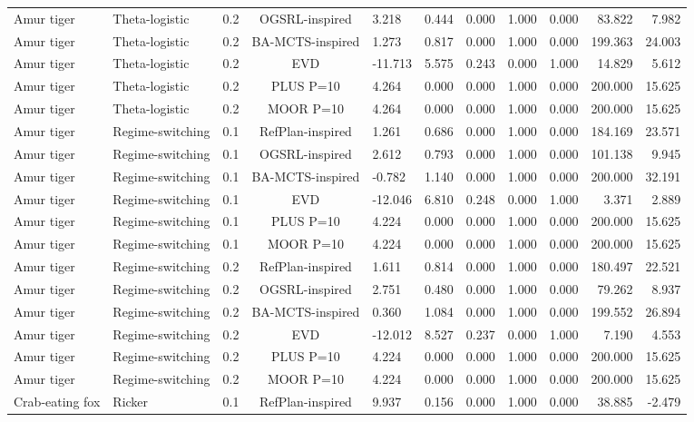 \documentclass[10pt]{article}
\begin{document}
\begin{landscape}
\begin{center}
\begin{longtable}{@{}lllclrrrrrr@{}}
Amur tiger & Theta-logistic & 0.2 & OGSRL-inspired & 3.218 & 0.444 & 0.000 & 1.000 & 0.000 & 83.822 & 7.982 \\
Amur tiger & Theta-logistic & 0.2 & BA-MCTS-inspired & 1.273 & 0.817 & 0.000 & 1.000 & 0.000 & 199.363 & 24.003 \\
Amur tiger & Theta-logistic & 0.2 & EVD & -11.713 & 5.575 & 0.243 & 0.000 & 1.000 & 14.829 & 5.612 \\
Amur tiger & Theta-logistic & 0.2 & PLUS P=10 & 4.264 & 0.000 & 0.000 & 1.000 & 0.000 & 200.000 & 15.625 \\
Amur tiger & Theta-logistic & 0.2 & MOOR P=10 & 4.264 & 0.000 & 0.000 & 1.000 & 0.000 & 200.000 & 15.625 \\
Amur tiger & Regime-switching & 0.1 & RefPlan-inspired & 1.261 & 0.686 & 0.000 & 1.000 & 0.000 & 184.169 & 23.571 \\
Amur tiger & Regime-switching & 0.1 & OGSRL-inspired & 2.612 & 0.793 & 0.000 & 1.000 & 0.000 & 101.138 & 9.945 \\
Amur tiger & Regime-switching & 0.1 & BA-MCTS-inspired & -0.782 & 1.140 & 0.000 & 1.000 & 0.000 & 200.000 & 32.191 \\
Amur tiger & Regime-switching & 0.1 & EVD & -12.046 & 6.810 & 0.248 & 0.000 & 1.000 & 3.371 & 2.889 \\
Amur tiger & Regime-switching & 0.1 & PLUS P=10 & 4.224 & 0.000 & 0.000 & 1.000 & 0.000 & 200.000 & 15.625 \\
Amur tiger & Regime-switching & 0.1 & MOOR P=10 & 4.224 & 0.000 & 0.000 & 1.000 & 0.000 & 200.000 & 15.625 \\
Amur tiger & Regime-switching & 0.2 & RefPlan-inspired & 1.611 & 0.814 & 0.000 & 1.000 & 0.000 & 180.497 & 22.521 \\
Amur tiger & Regime-switching & 0.2 & OGSRL-inspired & 2.751 & 0.480 & 0.000 & 1.000 & 0.000 & 79.262 & 8.937 \\
Amur tiger & Regime-switching & 0.2 & BA-MCTS-inspired & 0.360 & 1.084 & 0.000 & 1.000 & 0.000 & 199.552 & 26.894 \\
Amur tiger & Regime-switching & 0.2 & EVD & -12.012 & 8.527 & 0.237 & 0.000 & 1.000 & 7.190 & 4.553 \\
Amur tiger & Regime-switching & 0.2 & PLUS P=10 & 4.224 & 0.000 & 0.000 & 1.000 & 0.000 & 200.000 & 15.625 \\
Amur tiger & Regime-switching & 0.2 & MOOR P=10 & 4.224 & 0.000 & 0.000 & 1.000 & 0.000 & 200.000 & 15.625 \\
Crab-eating fox & Ricker & 0.1 & RefPlan-inspired & 9.937 & 0.156 & 0.000 & 1.000 & 0.000 & 38.885 & -2.479 \\

\end{longtable}
\end{center}
\end{landscape}
\end{document}
